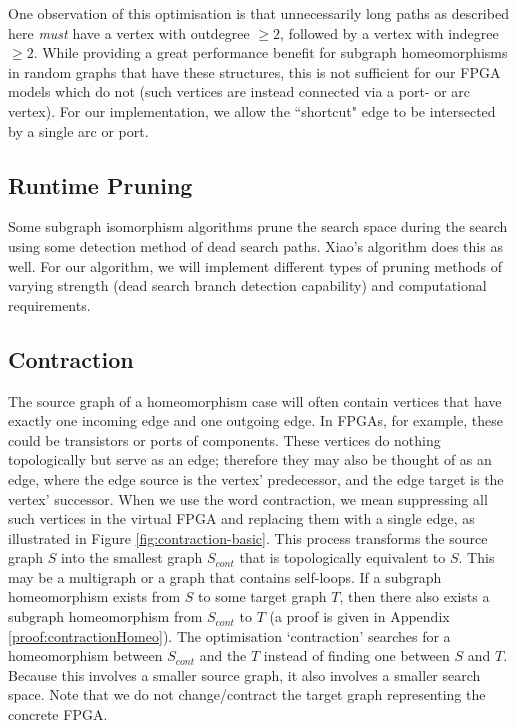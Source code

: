 One observation of this optimisation is that unnecessarily long paths as described here \textit{must} have a vertex with outdegree $\geq 2$, followed by a vertex with indegree $\geq 2$. While providing a great performance benefit for subgraph homeomorphisms in random graphs that have these structures, this is not sufficient for our FPGA models which do not (such vertices are instead connected via a port- or arc vertex). For our implementation, we allow the ``shortcut" edge to be intersected by a single arc or port.

\subsection{Runtime Pruning}
Some subgraph isomorphism algorithms \cite{Cordella2004, McCreesh2015} prune the search space during the search using some detection method of dead search paths. Xiao's algorithm does this as well. For our algorithm, we will implement different types of pruning methods of varying strength (dead search branch detection capability) and computational requirements.

\subsection{Contraction}
\label{sec:contraction}
The source graph of a homeomorphism case will often contain vertices that have exactly one incoming edge and one outgoing edge. In FPGAs, for example, these could be transistors or ports of components. These vertices do nothing topologically but serve as an edge; therefore they may also be thought of as an edge, where the edge source is the vertex' predecessor, and the edge target is the vertex' successor. When we use the word contraction, we mean suppressing all such vertices in the virtual FPGA and replacing them with a single edge, as illustrated in Figure \ref{fig:contraction-basic}. This process transforms the source graph $S$ into the smallest graph $S_{cont}$ that is topologically equivalent to $S$. This may be a multigraph or a graph that contains self-loops. If a subgraph homeomorphism exists from $S$ to some target graph $T$, then there also exists a subgraph homeomorphism from $S_{cont}$ to $T$ (a proof is given in Appendix \ref{proof:contractionHomeo}). The optimisation `contraction' searches for a homeomorphism between $S_{cont}$ and the $T$ instead of finding one between $S$ and $T$. Because this involves a smaller source graph, it also involves a smaller search space. Note that we do not change/contract the target graph representing the concrete FPGA.

